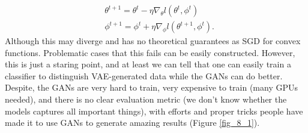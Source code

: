 \documentclass[../book-template.tex]{subfiles}
\begin{document}
\begin{align*}
	&\theta^{t+1}=\theta^t-\eta \nabla_\theta l(\theta^t,\phi^t)\\
	&\phi^{t+1}=\phi^t+\eta \nabla_\phi l(\theta^{t+1},\phi^t).
\end{align*}
Although this may diverge and has no theoretical guarantees as SGD for convex functions. Problematic cases that this fails can be easily constructed. However, this is just a staring point, and at least we can tell that one can easily train a classifier to distinguish VAE-generated data while the GANs can do better. Despite, the GANs are very hard to train, very expensive to train (many GPUs needed), and there is no clear evaluation metric (we don't know whether the models captures all important things), with efforts and proper tricks people have made it to use GANs to generate amazing results (Figure \ref{fig_8_1}).
\end{document}
